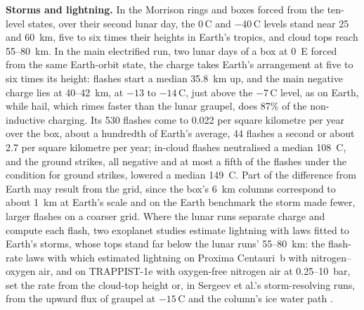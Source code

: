 \textbf{Storms and lightning.} In the Morrison rings and boxes forced from the ten-level states, over their second
lunar day, the 0\,\textdegree C and $-40$\,\textdegree C levels stand near 25 and 60~km, five to six times their
heights in Earth's tropics, and cloud tops reach 55--80~km. In the main electrified run, two lunar days
of a box at 0\textdegree~E forced from the same Earth-orbit state, the charge takes Earth's arrangement at five to
six times its height: flashes start a median 35.8~km up, and the main negative charge lies at 40--42~km, at $-13$
to $-14$\,\textdegree C, just above the $-7$\,\textdegree C level, as on Earth, while hail, which rimes faster than
the lunar graupel, does 87\% of the non-inductive charging. Its 530 flashes come to 0.022 per square kilometre per
year over the box, about a hundredth of Earth's average, 44 flashes a second \autocite{christian2003global} or about 2.7 per square
kilometre per year;
in-cloud flashes neutralised a median 108~C, and the ground strikes, all negative and at most a fifth of the
flashes under the condition for ground strikes, lowered a median 149~C. Part of the difference from Earth may result from the grid, since the box's 6~km columns correspond to about 1~km at Earth's scale and on the Earth benchmark the storm made fewer, larger flashes on a coarser grid. Where the lunar runs separate charge and compute each flash, two exoplanet studies estimate lightning with laws fitted to Earth's storms, whose tops stand far below the lunar runs' 55--80~km: the flash-rate laws with which
\textcite{braam2022lightning} estimated lightning on Proxima Centauri~b with nitrogen--oxygen air, and
\textcite{sergeev2025lightning} on TRAPPIST-1e with oxygen-free nitrogen air at 0.25--10~bar, set the rate from the
cloud-top height \autocite{price1992simple} or, in Sergeev et al.'s storm-resolving runs, from the upward flux of
graupel at $-15$\,\textdegree C and the column's ice water path \autocite{mccaul2009forecasting}.

